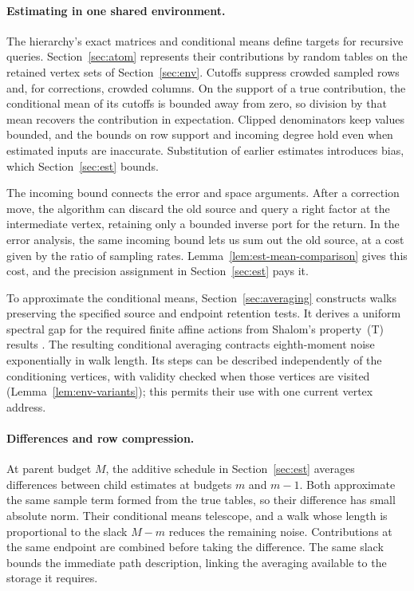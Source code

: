 \paragraph{Estimating in one shared environment.}
The hierarchy's exact matrices and conditional means define targets for
recursive queries. Section~\ref{sec:atom} represents their contributions
by random tables on the retained vertex sets of Section~\ref{sec:env}.
Cutoffs suppress crowded sampled rows and, for corrections, crowded
columns. On the support of a true contribution, the conditional mean
of its cutoffs is bounded away from zero, so division by that mean
recovers the contribution in expectation. Clipped denominators keep
values bounded, and the bounds on row support and incoming degree hold
even when estimated inputs are inaccurate. Substitution of earlier
estimates introduces bias, which
Section~\ref{sec:est} bounds.

The incoming bound connects the error and space arguments. After a
correction move, the algorithm can discard the old source and query a
right factor at the intermediate vertex, retaining only a bounded
inverse port for the return. In the error analysis, the same incoming
bound lets us sum out the old source, at a cost given by the ratio of
sampling rates.
Lemma~\ref{lem:est-mean-comparison} gives this cost, and the precision
assignment in Section~\ref{sec:est} pays it.

To approximate the conditional means, Section~\ref{sec:averaging}
constructs walks preserving the specified source and endpoint retention
tests. It derives a uniform spectral gap for the required finite affine
actions from Shalom's property~(T) results
\cite[Theorems~2.1 and~2.6]{Shalom1999}. The resulting conditional
averaging contracts eighth-moment noise exponentially in walk length.
Its steps can be described independently of the conditioning vertices,
with validity checked when those vertices are visited
(Lemma~\ref{lem:env-variants}); this permits their use with one current
vertex address.

\paragraph{Differences and row compression.}
At parent budget $M$, the additive schedule in Section~\ref{sec:est}
averages differences between child estimates at budgets $m$ and $m-1$.
Both approximate the same sample term formed from the true tables, so
their difference has small absolute norm. Their conditional means telescope, and a walk
whose length is proportional to the slack $M-m$ reduces the remaining
noise. Contributions at the same endpoint are combined before taking
the difference. The same slack bounds the immediate path description,
linking the averaging available to the storage it requires.

